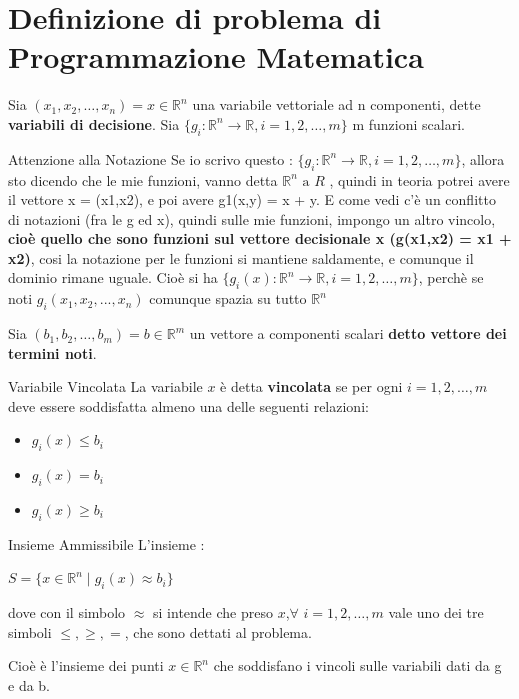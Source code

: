 \section{Definizione di problema di Programmazione Matematica}
Sia $(x_1,x_2,\dots,x_n) = x \in \mathbb{R}^n$ una variabile vettoriale ad n componenti, dette \textbf{variabili di decisione}.
Sia $\{g_i : \mathbb{R}^n \to \mathbb{R},i = 1,2,\dots,m \}$ m funzioni scalari.\\
\begin{warning}{Attenzione alla Notazione}
    Se io scrivo questo : $\{g_i : \mathbb{R}^n \to \mathbb{R},i = 1,2,\dots,m \}$, allora sto dicendo che le mie funzioni, vanno detta
    $\mathbb{R} ^ n \text{ a } R$ , quindi in teoria potrei avere il vettore x = (x1,x2), e poi avere g1(x,y) = x + y.
    E come vedi c'è un conflitto di notazioni (fra le g ed x), quindi sulle mie funzioni, impongo un altro vincolo, \textbf{cioè quello che sono funzioni
    sul vettore decisionale x (g(x1,x2) = x1 + x2)}, cosi la notazione per le funzioni si mantiene saldamente, 
    e comunque il dominio rimane uguale.
    Cioè si ha $\{g_i(x) : \mathbb{R}^n \to \mathbb{R},i = 1,2,\dots,m \}$,
    perchè se noti $g_i(x_1,x_2,...,x_n)$ comunque spazia su tutto $\mathbb{R}^n$
\end{warning}
Sia $(b_1,b_2,\dots,b_m) = b \in \mathbb{R}^m$ un vettore a componenti scalari \textbf{detto vettore dei termini noti}.
\begin{definition}{Variabile Vincolata}
    La variabile $x$ è detta \textbf{vincolata} se per ogni $i = 1,2,\dots,m$ deve essere soddisfatta almeno una delle seguenti relazioni:
    \begin{itemize}
        \item $g_i(x) \leq b_i$
        \item $g_i(x) = b_i$
        \item $g_i(x) \geq b_i$ 
    \end{itemize}
\end{definition}
\begin{definition}{Insieme Ammissibile}
    L'insieme :
    \begin{center}
        $S = \{x \in \mathbb{R}^n \mid g_i(x) \approx b_i\}$
    \end{center}
    dove con il simbolo $\approx$ si intende che preso $x$,$\forall$ $i = 1,2,\dots,m$ vale uno dei tre simboli $\leq,\geq,=$, che sono dettati al problema.

    Cioè è l'insieme dei punti $x \in \mathbb{R} ^ n$ che soddisfano i vincoli sulle variabili dati da g e da b.
\end{definition}
